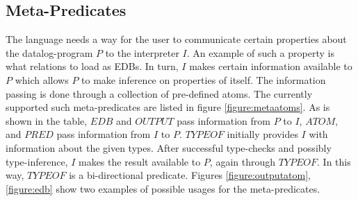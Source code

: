 \subsection{Meta-Predicates}
The language needs a way for the user to communicate certain properties about the datalog-program $P$ to the interpreter $I$.
An example of such a property is what relations to load as EDBs.
In turn, $I$ makes certain information available to $P$ which allows $P$ to make inference on properties of itself.
The information passing is done through a collection of pre-defined atoms. The currently supported such meta-predicates are listed in figure \ref{figure:metaatoms}. As is shown in the table, $EDB$ and $OUTPUT$ pass information from $P$ to $I$, $ATOM$, and $PRED$ pass information from $I$ to $P$. $TYPEOF$ initially provides $I$ with information about the given types. After successful type-checks and possibly type-inference, $I$ makes the result available to $P$, again through $TYPEOF$. In this way, $TYPEOF$ is a bi-directional predicate. Figures \ref{figure:outputatom}, \ref{figure:edb} show two examples of possible usages for the meta-predicates.

